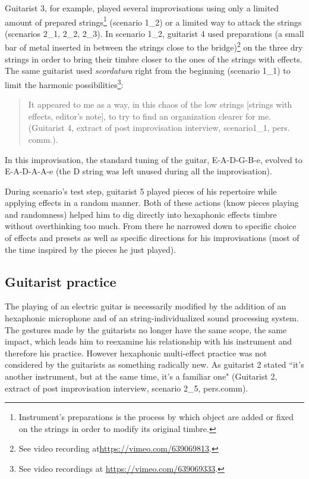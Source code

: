 \documentclass{article}
\begin{document}
Guitarist 3, for example, played several improvisations using only a limited amount of prepared strings\footnote{Instrument's preparations is the process by which object are added or fixed on the strings in order to modify its original timbre.} (scenario 1\_2) or a limited way to attack the strings (scenarios 2\_1, 2\_2, 2\_3). In scenario 1\_2, guitarist 4 used preparations (a small bar of metal inserted in between the strings close to the bridge)\footnote{See video recording at\url{https://vimeo.com/639069813}.} on the three dry strings in order to bring their timbre closer to the ones of the strings with effects. The same guitarist used \textit{scordatura} right from the beginning (scenario 1\_1) to limit the harmonic possibilities\footnote{See video recordings at \url{https://vimeo.com/639069333}.}:
    \begin{quote}
     It appeared to me as a way, in this chaos of the low strings [strings with effects, editor's note], to try to find an organization clearer for me. (Guitarist 4, extract of post improvisation interview, scenario1\_1, pers. comm.).
    \end{quote}
In this improvisation, the standard tuning of the guitar, E-A-D-G-B-e, evolved to E-A-D-A-A-e (the D string was left unused during all the improvisation). 

During scenario's test step, guitarist 5 played pieces of his repertoire while applying effects in a random manner. Both of these actions (know pieces playing and randomness) helped him to dig directly into hexaphonic effects timbre without overthinking too much. From there he narrowed down to specific choice of effects and presets as well as specific directions for his improvisations (most of the time inspired by the pieces he just played). 

\subsection{Guitarist practice}
The playing of an electric guitar is necessarily modified by the addition of an hexaphonic microphone and of an string-individualized sound processing system. The gestures made by the guitarists no longer have the same scope, the same impact, which leads him to reexamine his relationship with his instrument and therefore his practice.
However hexaphonic multi-effect practice was not considered by the guitarists as something radically new.  As guitarist 2 stated ``it's another instrument, but at the same time, it's a familiar one" (Guitarist 2, extract of post improvisation interview,  scenario 2\_5, pers.comm). 
\end{document}
